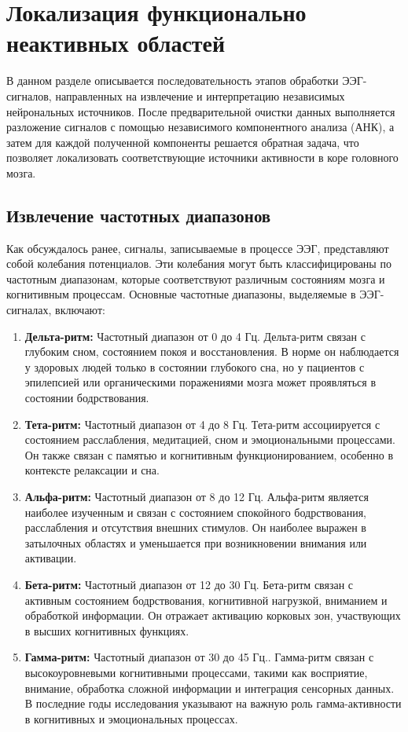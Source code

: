 \chapter{Локализация функционально неактивных областей}
\label{ch:chap2}
В данном разделе описывается последовательность этапов обработки ЭЭГ-сигналов, направленных на извлечение и интерпретацию независимых нейрональных источников. После предварительной очистки данных выполняется разложение сигналов с помощью независимого компонентного анализа (АНК), а затем для каждой полученной компоненты решается обратная задача, что позволяет локализовать соответствующие источники активности в коре головного мозга.
\section{Извлечение частотных диапазонов}

Как обсуждалось ранее, сигналы, записываемые в процессе ЭЭГ, представляют собой колебания потенциалов. Эти колебания могут быть классифицированы по частотным диапазонам, которые соответствуют различным состояниям мозга и когнитивным процессам. Основные частотные диапазоны, выделяемые в ЭЭГ-сигналах, включают:

\begin{enumerate}
    \item \textbf{Дельта-ритм:}
    Частотный диапазон от 0 до 4 Гц. Дельта-ритм связан с глубоким сном, состоянием покоя и восстановления. В норме он наблюдается у здоровых людей только в состоянии глубокого сна, но у пациентов с эпилепсией или органическими поражениями мозга может проявляться в состоянии бодрствования.
    \item \textbf{Тета-ритм:}
     Частотный диапазон от 4 до 8 Гц. Тета-ритм ассоциируется с состоянием расслабления, медитацией, сном и эмоциональными процессами. Он также связан с памятью и когнитивным функционированием, особенно в контексте релаксации и сна.
    \item \textbf{Альфа-ритм:}
    Частотный диапазон от 8 до 12 Гц. Альфа-ритм является наиболее изученным и связан с состоянием спокойного бодрствования, расслабления и отсутствия внешних стимулов. Он наиболее выражен в затылочных областях и уменьшается при возникновении внимания или активации.
    \item \textbf{Бета-ритм:}
    Частотный диапазон от 12 до 30 Гц. Бета-ритм связан с активным состоянием бодрствования, когнитивной нагрузкой, вниманием и обработкой информации. Он отражает активацию корковых зон, участвующих в высших когнитивных функциях.
    \item \textbf{Гамма-ритм:}
    Частотный диапазон от 30 до 45 Гц.. Гамма-ритм связан с высокоуровневыми когнитивными процессами, такими как восприятие, внимание, обработка сложной информации и интеграция сенсорных данных. В последние годы исследования указывают на важную роль гамма-активности в когнитивных и эмоциональных процессах.
\end{enumerate}

